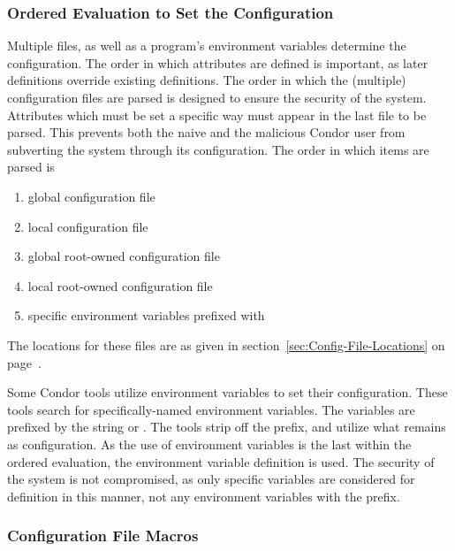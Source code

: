 \subsubsection{\label{sec:Ordering-Config-File}Ordered Evaluation to
Set the Configuration} 

Multiple files, as well as a program's environment variables
determine the configuration.
The order in which attributes are defined is important, as later
definitions override existing definitions.
The order in which the (multiple) configuration files are parsed 
is designed to ensure the security of the system.
Attributes which must be set a specific way 
must appear in the last file to be parsed.
This prevents both the naive and the malicious Condor user 
from subverting the system through its configuration.
The order in which items are parsed is
\begin{enumerate}
\item global configuration file
\item local configuration file
\item global root-owned configuration file
\item local root-owned configuration file
\item specific environment variables prefixed with 
\end{enumerate}

The locations for these files are as given in
section~\ref{sec:Config-File-Locations} on
page~\pageref{sec:Config-File-Locations}.

Some Condor tools utilize environment variables to set their
configuration.
These tools search for specifically-named environment variables.
The variables are prefixed by the string 
or .
The tools strip off the prefix, and utilize what remains
as configuration.
As the use of environment variables is the last within
the ordered evaluation, 
the environment variable definition is used.
The security of the system is not compromised,
as only specific variables are considered for definition
in this manner, not any environment variables with
the  prefix.


\subsubsection{\label{sec:Config-File-Macros}Configuration File Macros} 

